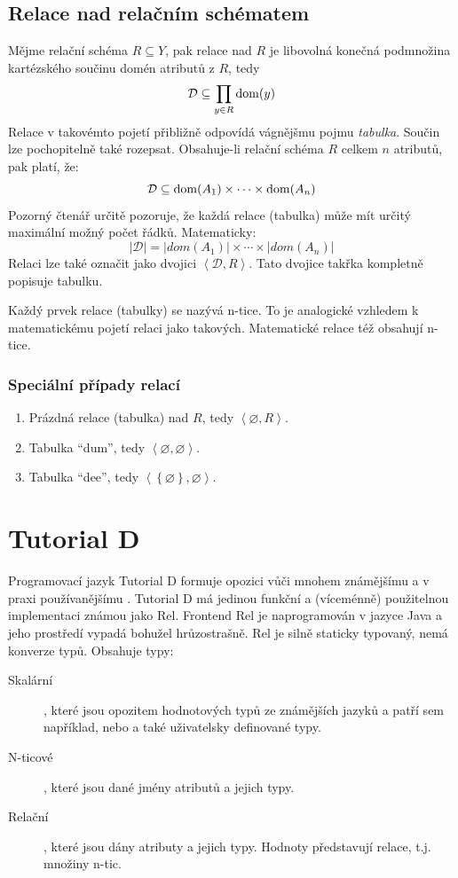 \subsection{Relace nad relačním schématem}
\begin{uptheorem}
Mějme relační schéma $R\subseteq Y$, pak relace nad $R$ je libovolná konečná podmnožina kartézského součinu domén atributů z $R$, tedy
$$
\mathcal{D} \subseteq \prod_{y \in R} \operatorname{dom}(y)
$$
Relace v takovémto pojetí přibližně odpovídá vágnějšmu pojmu \textit{tabulka}. Součin lze pochopitelně také rozepsat. Obsahuje-li relační schéma $R$ celkem $n$ atributů, pak platí, že:
$$
\mathcal{D} \subseteq \operatorname{dom}(A_{1}) \times \cdots \times \operatorname{dom}(A_{n})
$$
Pozorný čtenář určitě pozoruje, že každá relace (tabulka) může mít určitý maximální možný počet řádků. Matematicky:
$$
\left|\mathcal{D}\right| = \left|dom(A_{1})\right| \times \cdots \times \left|dom(A_{n})\right|
$$
Relaci lze také označit jako dvojici $\left\langle \mathcal{D}, R \right\rangle$. Tato dvojice takřka kompletně popisuje tabulku.
\end{uptheorem}
Každý prvek relace (tabulky) se nazývá n-tice. To je analogické vzhledem k matematickému pojetí relaci jako takových. Matematické relace též obsahují n-tice.

\subsubsection{Speciální případy relací}
\begin{enumerate}
\item Prázdná relace (tabulka) nad $R$, tedy $\left\langle \varnothing, R \right\rangle$.
\item Tabulka \enquote{dum}, tedy $\left\langle \varnothing, \varnothing \right\rangle$.
\item Tabulka \enquote{dee}, tedy $\left\langle \left\{ \varnothing \right\}, \varnothing \right\rangle$.
\end{enumerate}

\section{Tutorial D}
Programovací jazyk Tutorial D formuje opozici vůči mnohem známějšímu a v praxi používanějšímu . Tutorial D má jedinou funkční a (víceménně) použitelnou implementaci známou jako Rel. Frontend Rel je naprogramován v jazyce Java a jeho prostředí vypadá bohužel hrůzostrašně. Rel je silně staticky typovaný, nemá konverze typů. Obsahuje typy:
\begin{description}
\item[Skalární], které jsou opozitem hodnotových typů ze známějších jazyků a patří sem například, nebo a také uživatelsky definované typy.
\item[N-ticové], které jsou dané jmény atributů a jejich typy.
\item[Relační], které jsou dány atributy a jejich typy. Hodnoty představují relace, t.j. množiny n-tic.
\end{description}


